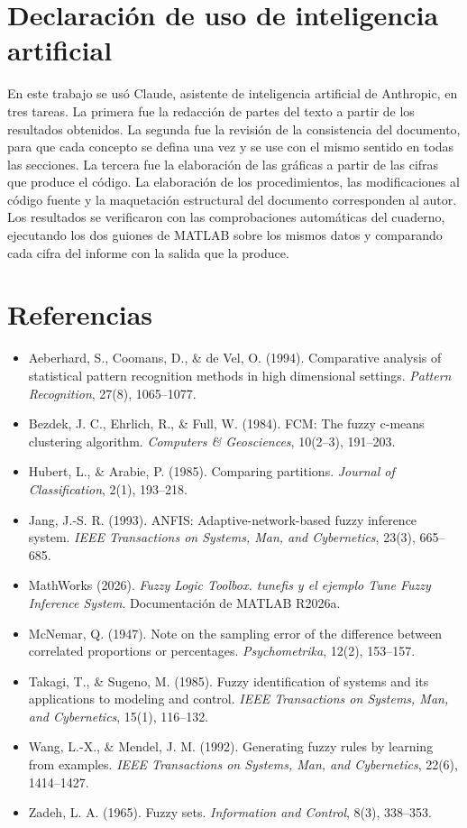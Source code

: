 \documentclass[11pt,letterpaper]{article}
\begin{document}
\section{Declaración de uso de inteligencia artificial}

En este trabajo se usó Claude, asistente de inteligencia artificial de Anthropic, en tres tareas. La primera fue la redacción de partes del texto a partir de los resultados obtenidos. La segunda fue la revisión de la consistencia del documento, para que cada concepto se defina una vez y se use con el mismo sentido en todas las secciones. La tercera fue la elaboración de las gráficas a partir de las cifras que produce el código. La elaboración de los procedimientos, las modificaciones al código fuente y la maquetación estructural del documento corresponden al autor. Los resultados se verificaron con las comprobaciones automáticas del cuaderno, ejecutando los dos guiones de MATLAB sobre los mismos datos y comparando cada cifra del informe con la salida que la produce.

\section{Referencias}
\begin{itemize}
    \item Aeberhard, S., Coomans, D., \& de Vel, O. (1994). Comparative analysis of statistical pattern recognition methods in high dimensional settings. \textit{Pattern Recognition}, 27(8), 1065--1077.
    \item Bezdek, J. C., Ehrlich, R., \& Full, W. (1984). FCM: The fuzzy c-means clustering algorithm. \textit{Computers \& Geosciences}, 10(2--3), 191--203.
    \item Hubert, L., \& Arabie, P. (1985). Comparing partitions. \textit{Journal of Classification}, 2(1), 193--218.
    \item Jang, J.-S. R. (1993). ANFIS: Adaptive-network-based fuzzy inference system. \textit{IEEE Transactions on Systems, Man, and Cybernetics}, 23(3), 665--685.
    \item MathWorks (2026). \textit{Fuzzy Logic Toolbox. tunefis y el ejemplo Tune Fuzzy Inference System}. Documentación de MATLAB R2026a.
    \item McNemar, Q. (1947). Note on the sampling error of the difference between correlated proportions or percentages. \textit{Psychometrika}, 12(2), 153--157.
    \item Takagi, T., \& Sugeno, M. (1985). Fuzzy identification of systems and its applications to modeling and control. \textit{IEEE Transactions on Systems, Man, and Cybernetics}, 15(1), 116--132.
    \item Wang, L.-X., \& Mendel, J. M. (1992). Generating fuzzy rules by learning from examples. \textit{IEEE Transactions on Systems, Man, and Cybernetics}, 22(6), 1414--1427.
    \item Zadeh, L. A. (1965). Fuzzy sets. \textit{Information and Control}, 8(3), 338--353.
\end{itemize}
\end{document}
